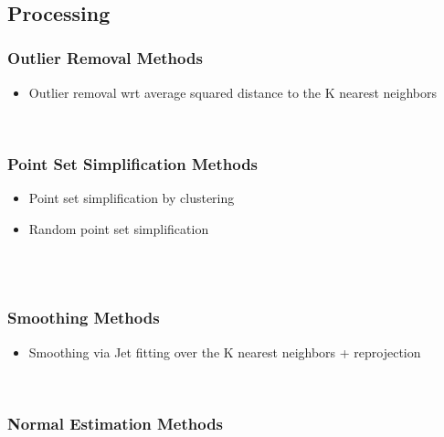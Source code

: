   \\
  \\
  \\


\subsection{Processing}

\subsubsection{Outlier Removal Methods}

\begin{itemize}
\item Outlier removal wrt average squared distance to the K nearest neighbors
\end{itemize}

  \\


\subsubsection{Point Set Simplification Methods}

\begin{itemize}
\item Point set simplification by clustering
\item Random point set simplification
\end{itemize}

  \\
  \\


\subsubsection{Smoothing Methods}

\begin{itemize}
\item Smoothing via Jet fitting over the K nearest neighbors + reprojection
\end{itemize}

  \\


\subsubsection{Normal Estimation Methods}

